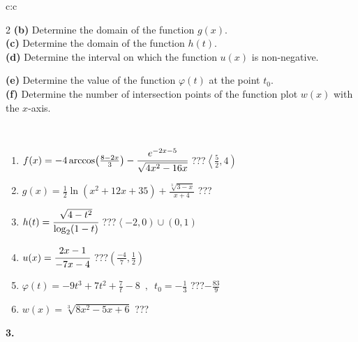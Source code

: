 \documentclass[10pt]{report}
\begin{document}
\begin{tabular}{c:c}
\begin{minipage}[c][104.5mm][t]{0.5\linewidth}
\begin{center}
\begin{minipage}{0.95\linewidth}
\begin{center}
{\begin{multicols}{2}
\textbf{(b)} Determine the domain of the function \(g(x)\). \\[1mm]
\textbf{(c)} Determine the domain of the function \(h(t)\). \\[1mm]
\textbf{(d)} Determine the interval on which the function \(u(x)\) is non-negative. \par \columnbreak
\textbf{(e)} Determine the value of the function \(\varphi(t)\) at the point \(t_0\). \\[1mm]
\textbf{(f)} Determine the number of intersection points of the function plot \(w(x)\) with the \(x\)-axis. \\[1mm]
\end{multicols}
}
\end{center}
\end{minipage}
\\[4mm]
\begin{minipage}{0.79\linewidth}
\begin{center}
\begin{varwidth}{\linewidth}
\begin{enumerate}
\small
\item $f(x) = -4\arccos\!\left( \frac{8-2x}{3} \right) - \cfrac{e^{-2x-5}}{\sqrt{4x^2-16x}}$\quad \dotfill\; ???\;\dotfill \quad $\left\langle\frac{5}{2} , 4\right)$
\item $g(x) = \frac{1}{2} \ln{\!(x^2+12x+35)}+\frac{\sqrt[3]{3-x}}{x+4}$\quad \dotfill\; ???\;\dotfill {}
\item $h(t) = \cfrac{\sqrt{4-t^2}}{\log_2(1-t)}$\quad \dotfill\; ???\;\dotfill \quad $\left\langle-2 , 0\right)\cup\left(0 , 1\right)$
\item $u(x) = \cfrac{2x-1}{-7x-4}$\quad \dotfill\; ???\;\dotfill \quad $\left(\frac{-4}{7} , \frac{1}{2}\right)$
\item $\varphi(t) = -9t^3+7t^2+\frac{7}{t}-8 \enspace , \enspace t_0=-\frac{1}{3}$\quad \dotfill\; ???\;\dotfill \quad $-\frac{83}{9}$
\item $w(x) = \sqrt[3]{8x^2-5x+6}$\quad \dotfill\; ???\;\dotfill {}
\end{enumerate}
\end{varwidth}
\end{center}
\end{minipage}
\begin{minipage}{0.20\linewidth}
\begin{center}
{\Huge\bfseries 3.} \\[2mm]

\end{center}
\end{minipage}
\end{center}
\end{minipage}
\end{tabular}
\end{document}
